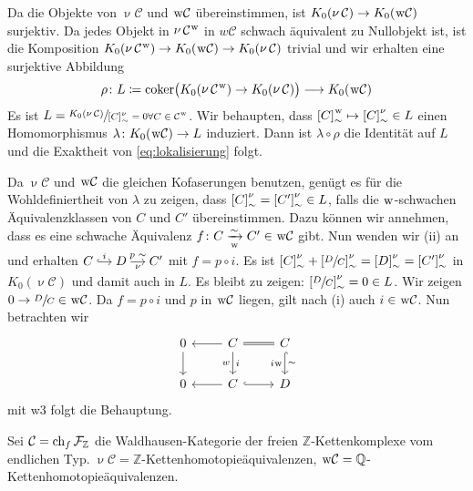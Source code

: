 \begin{beweis}
	Da die Objekte von $\mathop{\nu} \mathcal{C}$ und $\w \mathcal{C}$ übereinstimmen, ist $K_0(\mathop{\nu} \mathcal{C}) \to K_0(\w \mathcal{C})$ surjektiv.
	Da jedes Objekt in $\mathop{\nu} \mathcal{C}^{\w}$ in $w \mathcal{C}$ schwach äquivalent zu Nullobjekt ist, ist die Komposition $K_0(\mathop{\nu} \mathcal{C}^{\w}) \to K_0(\w \mathcal{C}) \to K_0(\mathop{\nu} \mathcal{C})$ trivial und wir erhalten eine surjektive Abbildung
	\[
		\rho \colon L \coloneqq \coker \enbrace[\big]{K_0(\mathop{\nu} \mathcal{C}^{\w}) \to K_0(\mathop{\nu} \mathcal{C})} \longrightarrow K_0(\w \mathcal{C})
	\]
	Es ist $L = \sfrac{K_0(\mathop{\nu} \mathcal{C})}{\benbrace*{C}_\sim^\nu =0 \forall C \in \mathcal{C}^{\w}}$.
	Wir behaupten, dass $\benbrace*{C}_\sim^{\w} \mapsto \benbrace*{C}_\sim^\nu \in L$ einen Homomorphismus $\lambda \colon K_0(\w \mathcal{C}) \to L$ induziert.
	Dann ist $\lambda \circ \rho $ die Identität auf $L$ und die Exaktheit von \eqref{eq:lokalisierung} folgt.

	Da $\mathop{\nu} \mathcal{C}$ und $\w \mathcal{C}$ die gleichen Kofaserungen benutzen, genügt es für die Wohldefiniertheit von $\lambda$ zu zeigen, dass $\benbrace*{C}^\nu_\sim = \benbrace*{C'}_\sim^\nu \in L$, falls die $\w$-schwachen Äquivalenzklassen von $C$ und $C'$ übereinstimmen.
	Dazu können wir annehmen, dass es eine schwache Äquivalenz $f \colon C \xrightarrow[\w]{\sim} C' \in \w \mathcal{C}$ gibt.
	Nun wenden wir (ii) an und erhalten
	\(
		\begin{tikzcd}[cramped,sep=small] C \rar[hook,"i"] & D \rar["p\,\, \sim","\nu"'] & C' \end{tikzcd}
	\)
	mit $f = p \circ i$.
	Es ist $\benbrace*{C}_\sim^\nu + \benbrace*{\sfrac{D}{C}}_\sim^\nu = \benbrace*{D}^\nu_\sim = \benbrace*{C'}_\sim^\nu$ in $K_0(\mathop{\nu} \mathcal{C})$ und damit auch in $L$.
	Es bleibt zu zeigen: $\benbrace*{\sfrac{D}{C}}^\nu_\sim =0 \in L$.
	Wir zeigen $0 \to \sfrac{D}{C} \in \w \mathcal{C}$.
	Da $f = p \circ i$ und $p$ in $\w \mathcal{C}$ liegen, gilt nach (i) auch $i \in \w \mathcal{C}$.
	Nun betrachten wir
	\[
		\begin{tikzcd}
			0 \dar & C \rar[equals] \lar \dar["i","w"'] & C \dar[hook,"\sim","i \w"']  \\
			0 & C \lar \rar[hook] & D
		\end{tikzcd}
	\]
	mit w3 folgt die Behauptung.
\end{beweis}

\begin{beispiel}
	Sei $\mathcal{C} = \ch_f \mathcal{F}_\mathbb{Z}$ die Waldhausen-Kategorie der freien $\mathbb{Z}$-Kettenkomplexe vom endlichen Typ.
	$\mathop{\nu} \mathcal{C} = \mathbb{Z}$-Kettenhomotopieäquivalenzen, $\w \mathcal{C} = \mathbb{Q}$-Kettenhomotopieäquivalenzen.
\end{beispiel}

